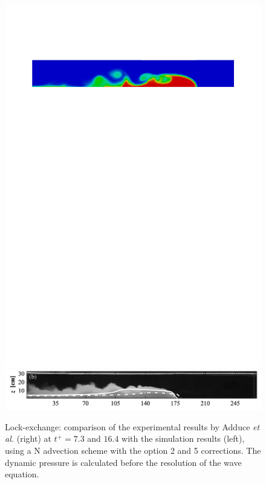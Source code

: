 \begin{figure}[ht]
\begin{center}
    \includegraphics[scale=0.41, trim=50 648 0 100, clip]{./img/lock_adduce_9_dp_yes_PSI2_5corr.pdf} \hspace{-0.7cm}
    \includegraphics[scale=0.22, trim=88 40 165 0, clip]{./img/adduce_9.png}
    \caption{Lock-exchange: comparison of the experimental results by Adduce \textit{et al.} \cite{Adduce2012} (right)
      at $t^+=7.3$ and $16.4$ with the simulation results (left),
      using a N advection scheme with the option 2 and 5 corrections.
      The dynamic pressure is calculated before the resolution of the wave equation.}
    \label{fig:lock_adduce_dp_yes_PSI2_5corr}
  \end{center}
\end{figure}

